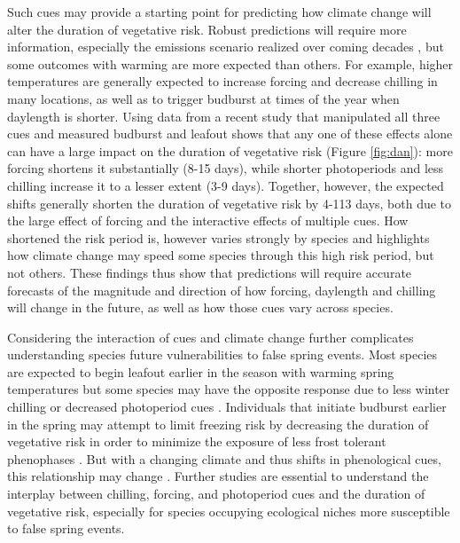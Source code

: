 \documentclass{article}\usepackage[]{graphicx}\usepackage[]{color}
\begin{document}
Such cues may provide a starting point for predicting how climate change will alter the duration of vegetative risk. Robust predictions will require more information, especially the emissions scenario realized over coming decades \citep{IPCC2014}, but some outcomes with warming are more expected than others. For example, higher temperatures are generally expected to increase forcing and decrease chilling in many locations, as well as to trigger budburst at times of the year when daylength is shorter. Using data from a recent study that manipulated all three cues and measured budburst and leafout \citep{Flynn2018} shows that any one of these effects alone can have a large impact on the duration of vegetative risk (Figure \ref{fig:dan}): more forcing shortens it substantially (8-15 days), while shorter photoperiods and less chilling increase it to a lesser extent (3-9 days). Together, however, the expected shifts generally shorten the duration of vegetative risk by 4-113 days, both due to the large effect of forcing and the interactive effects of multiple cues. How shortened the risk period is, however varies strongly by species and highlights how climate change may speed some species through this high risk period, but not others. These findings thus show that predictions will require accurate forecasts of the magnitude and direction of how forcing, daylength and chilling will change in the future, as well as how those cues vary across species. 

Considering the interaction of cues and climate change further complicates understanding species future vulnerabilities to false spring events. Most species are expected to begin leafout earlier in the season with warming spring temperatures but some species may have the opposite response due to less winter chilling or decreased photoperiod cues \citep{Cleland2006, Fu2015, Xin2016}. %
Individuals that initiate budburst earlier in the spring may attempt to limit freezing risk by decreasing the duration of vegetative risk in order to minimize the exposure of less frost tolerant phenophases \citep{Augspurger2009}. But with a changing climate and thus shifts in phenological cues, this relationship may change \citep{Dolezal2016}. Further studies are essential to understand the interplay between chilling, forcing, and photoperiod cues and the duration of vegetative risk, especially for species occupying ecological niches more susceptible to false spring events. 
\end{document}
